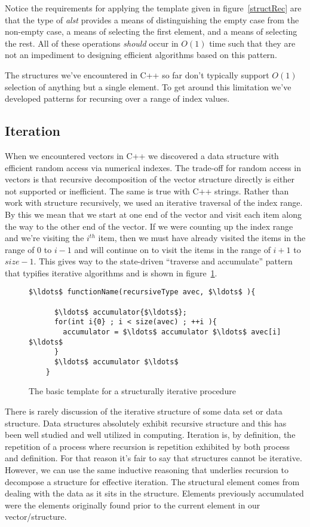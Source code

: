 \documentclass[nobib]{tufte-handout}
\begin{document}
Notice the requirements for applying the template given in figure~\ref{structRec} are that the type of \textit{alst} provides a means of distinguishing the empty case from the non-empty case, a means of selecting the first element, and a means of selecting the rest. All of these operations \textit{should} occur in $O(1)$ time such that they are not an impediment to designing efficient algorithms based on this pattern.

The structures we've encountered in C++ so far don't typically support $O(1)$ selection of anything but a single element. To get around this limitation we've developed patterns for recursing over a range of index values.

\subsection{Iteration}

When we encountered vectors in C++ we discovered a data structure with efficient random access via numerical indexes. The trade-off for random access in vectors is that recursive decomposition of the vector structure directly is either not supported or inefficient. The same is true with C++ strings. Rather than work with structure recursively, we used an iterative traversal of the index range.  By this we mean that we start at one end of the vector and visit each item along the way to the other end of the vector. If we were counting up the index range and we're visiting the $i^{th}$ item, then we must have already visited the items in the range of $0$ to $i-1$ and will continue on to visit the items in the range of $i+1$ to $size-1$. This gives way to the state-driven ``traverse and accumulate'' pattern that typifies iterative algorithms and is shown in figure~\ref{structIter}.

\begin{figure}
  \begin{lstlisting}[mathescape=true]
    $\ldots$ functionName(recursiveType avec, $\ldots$ ){

      $\ldots$ accumulator{$\ldots$};
      for(int i{0} ; i < size(avec) ; ++i ){
        accumulator = $\ldots$ accumulator $\ldots$ avec[i] $\ldots$
      }
      $\ldots$ accumulator $\ldots$
    }
  \end{lstlisting}
\label{structIter}
\caption{The basic template for a structurally iterative procedure}
\end{figure}

There is rarely discussion of the iterative structure of some data set or data structure. Data structures absolutely exhibit recursive structure and this has been well studied and well utilized in computing.  Iteration is, by definition, the repetition of a process where recursion is repetition exhibited by both process and definition.  For that reason it's fair to say that structures cannot be iterative. However, we can use the same inductive reasoning that underlies recursion to decompose a structure for effective iteration. The structural element comes from dealing with the data as it sits in the structure. Elements previously accumulated were the elements originally found prior to the current element in our vector/structure.
\end{document}
